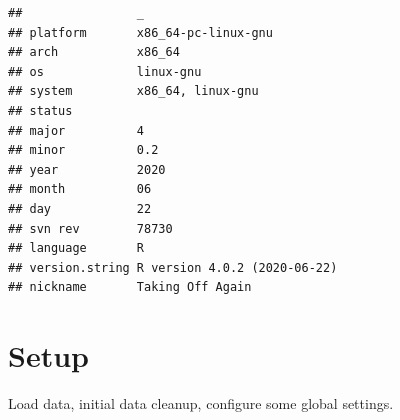 \documentclass[
]{book}
\begin{document}
\begin{verbatim}
##                _                           
## platform       x86_64-pc-linux-gnu         
## arch           x86_64                      
## os             linux-gnu                   
## system         x86_64, linux-gnu           
## status                                     
## major          4                           
## minor          0.2                         
## year           2020                        
## month          06                          
## day            22                          
## svn rev        78730                       
## language       R                           
## version.string R version 4.0.2 (2020-06-22)
## nickname       Taking Off Again
\end{verbatim}

\hypertarget{setup}{%
\section{Setup}\label{setup}}

Load data, initial data cleanup, configure some global settings.
\end{document}
